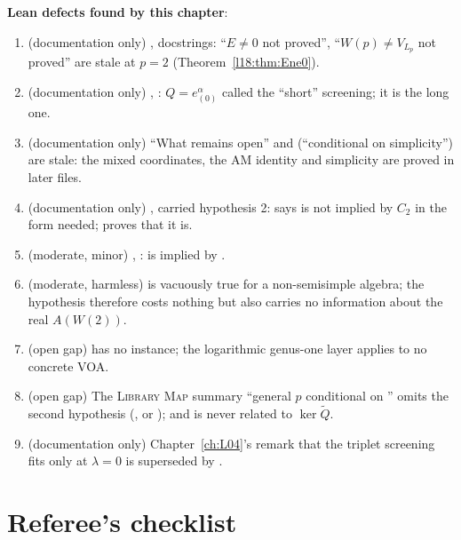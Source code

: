 \begin{warning}
\textbf{Lean defects found by this chapter}:
\begin{enumerate}
\item (documentation only) ,  docstrings: ``$E\ne0$ not proved'', ``$W(p)\ne V_{L_p}$ not
  proved'' are stale at $p=2$ (Theorem~\ref{l18:thm:Ene0}).
\item (documentation only) , : $Q=e^\alpha_{(0)}$ called the ``short'' screening; it is
  the long one.
\item (documentation only)  ``What remains open'' and  (``conditional
  on simplicity'') are stale: the mixed coordinates, the AM identity and simplicity are proved in later files.
\item (documentation only) , carried hypothesis 2: says  is not implied by $C_2$ in the form needed;
   proves that it is.
\item (moderate, minor) ,
  :  is implied by .
\item (moderate, harmless)  is vacuously true for a non-semisimple algebra;
  the hypothesis  therefore costs nothing but also carries no information about the real $A(W(2))$.
\item (open gap)  has no instance; the logarithmic genus-one layer applies to no concrete
  VOA.
\item (open gap) The \textsc{Library Map} summary ``general $p$ conditional on '' omits the second hypothesis
  (, or ); and  is never related to $\ker\widetilde Q$.
\item (documentation only) Chapter~\ref{ch:L04}'s remark that the triplet screening fits  only at $\lambda=0$ is
  superseded by .
\end{enumerate}
\end{warning}

\section{Referee's checklist}\label{l18:sec:checklist}

